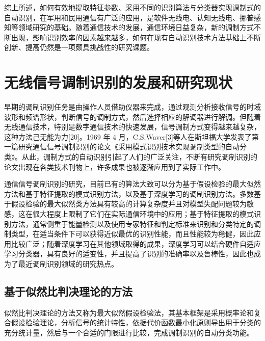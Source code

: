 综上所述，如何有效地提取特征参数、采用不同的识别算法与分类器实现调制式的自动识别，在军用和民用通信有广泛的应用，是软件无线电、认知无线电、挪普感知等领域研究的基础。随着通信技术的发展，通信环境日益复杂，新的调制方式不断出现，影响识别效率的因素越来越多，如何在现有自动识别技术方法基础上不断创新、提高仍然是一项颇具挑战性的研究课题。\par


\section{无线信号调制识别的发展和研究现状}

早期的调制识别任务是由操作人员借助仪器来完成，通过观测分析接收信号的时域波形和频谱形状，判断信号的调制方式，然后选择相应的解调器进行解调。但随着无线通信技术，特别是数字通信技术的快速发展，信号调制方式变得越来越复杂，这种方法己无能为力[20]。1969 年 4 月，C.S.Waver[3]等人在斯坦福大学发表了第一篇研究通信信号调制识别的论文《采用模式识别技术实现调制类型的自动分类》。从此，调制方式的自动识别引起了人们的广泛关注，不断有研究调制识别的论文出现在各类技术刊物上，许多成果也被逐渐应用到了实际工作中。 \par

通信信号调制识别的研究，目前已有的算法大致可以分为基于假设检验的最大似然方法和基于特征提取的模式识别方法，以及基于深度学习的调制识别方法。多数基于假设检验的最大似然类方法具有较高的计算复杂度并且对模型失配问题较为敏感，这在很大程度上限制了它们在实际通信环境中的应用；基于特征提取的模式识别方法，通常侧重于能量检测以及使用专家特征和判定标准来识别和分类特定的调制类型，在适当条件下可以获得近似最优的识别性能，而且性能较为稳健，因此应用比较广泛；随着深度学习在其他领域取得的成果，深度学习可以结合硬件自适应学习分类器，具有良好的适变性，并且提高了识别的准确率以及鲁棒性，因此也成为了最近调制识别领域的研究热点。\par

\subsection{基于似然比判决理论的方法}

似然比判决理论的方法又称为最大似然假设检验法，其基本框架是采用概率论和复合假设检验理论，分析信号的统计特性，依据代价函数最小化原则导出用于分类的充分统计量，然后与一个合适的门限进行比较，完成调制识别的自动分类功能。\par

